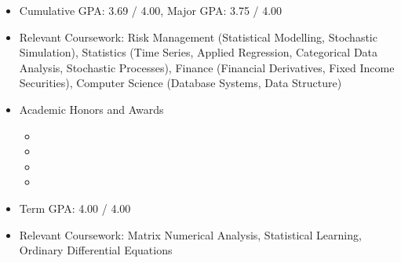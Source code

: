 \documentclass[10pt]{article}
\begin{document}
    \address{CUHK, Shatin, N.T., Hong Kong SAR}
    \maketitle
    \begin{itemize}
        \item Cumulative GPA: 3.69 / 4.00, Major GPA: 3.75 / 4.00
        \item Relevant Coursework: Risk Management (Statistical Modelling, Stochastic Simulation), Statistics (Time Series, Applied Regression, Categorical Data Analysis, Stochastic Processes), Finance (Financial Derivatives, Fixed Income Securities), Computer Science (Database Systems, Data Structure)
        \item Academic Honors and Awards
            \begin{itemize}
                \item {}
                \item {}
                \item {}
                \item {}
            \end{itemize}
    \end{itemize}
    \begin{itemize}
        \item Term GPA: 4.00 / 4.00
        \item Relevant Coursework: Matrix Numerical Analysis, Statistical Learning, Ordinary Differential Equations
    \end{itemize}
\end{document}
